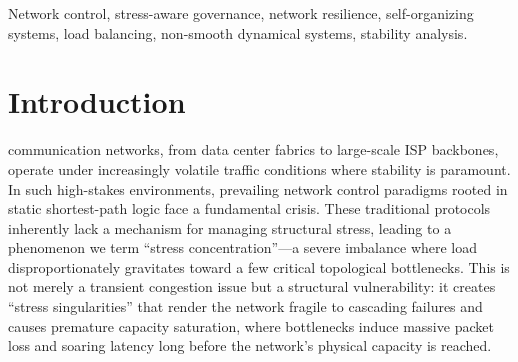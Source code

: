 \documentclass[journal]{IEEEtran}
\theoremstyle{plain}
\theoremstyle{definition}
\begin{document}
\begin{IEEEkeywords}
Network control, stress-aware governance, network resilience, self-organizing systems, load balancing, non-smooth dynamical systems, stability analysis.
\end{IEEEkeywords}


\section{Introduction}
\label{sec:introduction}

 communication networks, from data center fabrics to large-scale ISP backbones, operate under increasingly volatile traffic conditions where stability is paramount. 
In such high-stakes environments, prevailing network control paradigms rooted in static shortest-path logic face a fundamental crisis. 
These traditional protocols inherently lack a mechanism for managing structural stress, leading to a phenomenon we term ``stress concentration''---a severe imbalance where load disproportionately gravitates toward a few critical topological bottlenecks.
This is not merely a transient congestion issue but a structural vulnerability: it creates ``stress singularities'' that render the network fragile to cascading failures and causes premature capacity saturation, where bottlenecks induce massive packet loss and soaring latency long before the network's physical capacity is reached.
\end{document}

